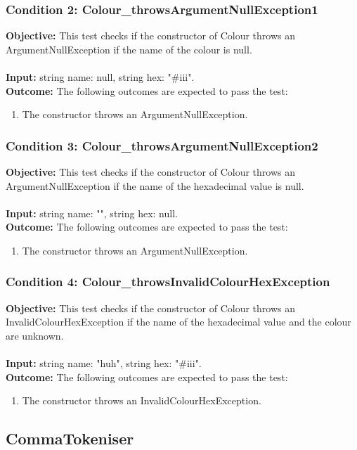 \documentclass[a4paper,12pt]{article}
\begin{document}
		\subsubsection{Condition 2: Colour\_throwsArgumentNullException1}
			\textbf{Objective:} This test checks if the constructor of Colour throws an ArgumentNullException if the name of the colour is null.\\\\
			\textbf{Input:} string name: null, string hex: "\#iii".\\
			\textbf{Outcome:} The following outcomes are expected to pass the test:
				\begin{enumerate}
					\item The constructor throws an ArgumentNullException.
				\end{enumerate}
		\subsubsection{Condition 3: Colour\_throwsArgumentNullException2}
			\textbf{Objective:} This test checks if the constructor of Colour throws an ArgumentNullException if the name of the hexadecimal value is null.\\\\
			\textbf{Input:} string name: "", string hex: null.\\
			\textbf{Outcome:} The following outcomes are expected to pass the test:
				\begin{enumerate}
					\item The constructor throws an ArgumentNullException.
				\end{enumerate}
		\subsubsection{Condition 4: Colour\_throwsInvalidColourHexException}
			\textbf{Objective:} This test checks if the constructor of Colour throws an InvalidColourHexException if the name of the hexadecimal value and the colour are unknown.\\\\
			\textbf{Input:} string name: "huh", string hex: "\#iii".\\
			\textbf{Outcome:} The following outcomes are expected to pass the test:
				\begin{enumerate}
					\item The constructor throws an InvalidColourHexException.
				\end{enumerate}
	\subsection{CommaTokeniser}
\end{document}
